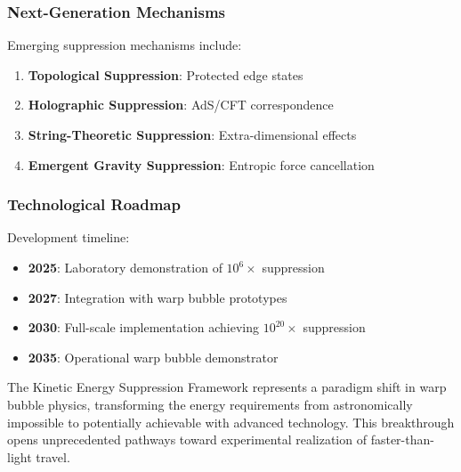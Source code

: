 \subsubsection{Next-Generation Mechanisms}

Emerging suppression mechanisms include:
\begin{enumerate}
\item \textbf{Topological Suppression}: Protected edge states
\item \textbf{Holographic Suppression}: AdS/CFT correspondence
\item \textbf{String-Theoretic Suppression}: Extra-dimensional effects
\item \textbf{Emergent Gravity Suppression}: Entropic force cancellation
\end{enumerate}

\subsubsection{Technological Roadmap}

Development timeline:
\begin{itemize}
\item \textbf{2025}: Laboratory demonstration of $10^6\times$ suppression
\item \textbf{2027}: Integration with warp bubble prototypes  
\item \textbf{2030}: Full-scale implementation achieving $10^{20}\times$ suppression
\item \textbf{2035}: Operational warp bubble demonstrator
\end{itemize}

The Kinetic Energy Suppression Framework represents a paradigm shift in warp bubble physics, transforming the energy requirements from astronomically impossible to potentially achievable with advanced technology. This breakthrough opens unprecedented pathways toward experimental realization of faster-than-light travel.
